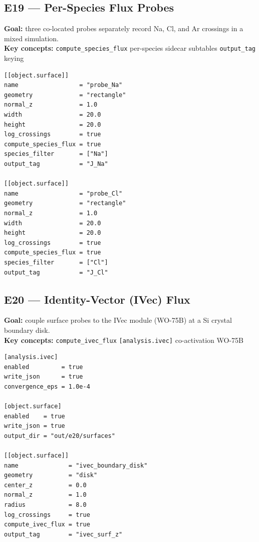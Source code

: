 \documentclass[11pt,a4paper]{article}
\begin{document}
\subsection*{E19 --- Per-Species Flux Probes}

\textbf{Goal:} three co-located probes separately record Na, Cl, and Ar
crossings in a mixed simulation.\\
\textbf{Key concepts:} \texttt{compute\_species\_flux} \textbullet{}
per-species sidecar subtables \textbullet{} \texttt{output\_tag} keying

\begin{tcolorbox}[scriptbox, scriptheader,
  title={scripts/e19\_surface\_species\_flux\_multi.vsim (excerpt)}]
\begin{lstlisting}[style=vsimlst]
[[object.surface]]
name                 = "probe_Na"
geometry             = "rectangle"
normal_z             = 1.0
width                = 20.0
height               = 20.0
log_crossings        = true
compute_species_flux = true
species_filter       = ["Na"]
output_tag           = "J_Na"

[[object.surface]]
name                 = "probe_Cl"
geometry             = "rectangle"
normal_z             = 1.0
width                = 20.0
height               = 20.0
log_crossings        = true
compute_species_flux = true
species_filter       = ["Cl"]
output_tag           = "J_Cl"
\end{lstlisting}
\end{tcolorbox}

\subsection*{E20 --- Identity-Vector (IVec) Flux}

\textbf{Goal:} couple surface probes to the IVec module (WO-75B) at a Si
crystal boundary disk.\\
\textbf{Key concepts:} \texttt{compute\_ivec\_flux} \textbullet{}
\texttt{[analysis.ivec]} co-activation \textbullet{} WO-75B

\begin{tcolorbox}[scriptbox, scriptheader,
  title={scripts/e20\_surface\_ivec\_flux.vsim}]
\begin{lstlisting}[style=vsimlst]
[analysis.ivec]
enabled         = true
write_json      = true
convergence_eps = 1.0e-4

[object.surface]
enabled    = true
write_json = true
output_dir = "out/e20/surfaces"

[[object.surface]]
name              = "ivec_boundary_disk"
geometry          = "disk"
center_z          = 0.0
normal_z          = 1.0
radius            = 8.0
log_crossings     = true
compute_ivec_flux = true
output_tag        = "ivec_surf_z"
\end{lstlisting}
\end{tcolorbox}
\end{document}
